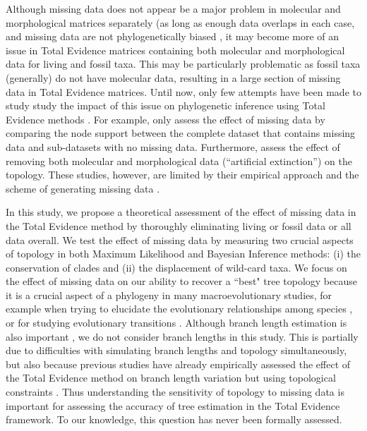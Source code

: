 \documentclass[12pt,letterpaper]{article}
\begin{document}
Although missing data does not appear be a major problem in molecular and morphological matrices separately (as long as enough data overlaps in each case, and missing data are not phylogenetically biased \citep{wiensmissing2003,Wiens01102005,wiensmissing2006,wiensmissing2008,lemmonthe2009,Sanderson22072011,rouresite-specific2011,pattinsonphylogeny2014}, it may become more of an issue in Total Evidence matrices containing both molecular and morphological data for living and fossil taxa.
This may be particularly problematic as fossil taxa (generally) do not have molecular data, resulting in a large section of missing data in Total Evidence matrices.
Until now, only few attempts have been made to study study the impact of this issue on phylogenetic inference using Total Evidence methods \citep[e.g.][]{Wiens01102005,pattinsonphylogeny2014}.
For example, \cite{Wiens01102005} only assess the effect of missing data by comparing the node support between the complete dataset that contains missing data and sub-datasets with no missing data.
Furthermore, \cite{pattinsonphylogeny2014} assess the effect of removing both molecular and morphological data (``artificial extinction'') on the topology.
These studies, however, are limited by their empirical approach \citep{Wiens01102005} and the scheme of generating missing data \citep{pattinsonphylogeny2014}.

In this study, we propose a theoretical assessment of the effect of missing data in the Total Evidence method by thoroughly eliminating living or fossil data or all data overall.
We test the effect of missing data by measuring two crucial aspects of topology in both Maximum Likelihood and Bayesian Inference methods: (i) the conservation of clades and (ii) the displacement of wild-card taxa.
We focus on the effect of missing data on our ability to recover a ``best" tree topology because it is a crucial aspect of a phylogeny in many macroevolutionary studies, for example when trying to elucidate the evolutionary relationships among species \citep[e.g.][]{meredithimpacts2011,jetzthe2012}, or for studying evolutionary transitions \citep[e.g.][]{friedmanexplosive2010}.
Although branch length estimation is also important \citep[namely for timing extinction and/or speciation events; e.g.][]{ronquista2012}, we do not consider branch lengths in this study.
This is partially due to difficulties with simulating branch lengths and topology simultaneously, but also because previous studies have already empirically assessed the effect of the Total Evidence method on branch length variation but using topological constraints \citep{ronquista2012,schragocombining2013,slaterphylogenetic2013,beckancient2014}.
Thus understanding the sensitivity of topology to missing data is important for assessing the accuracy of tree estimation in the Total Evidence framework. To our knowledge, this question has never been formally assessed.
\end{document}
